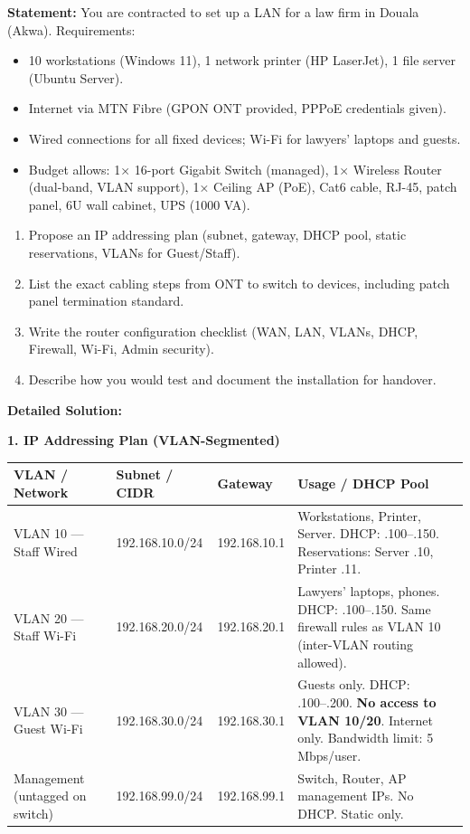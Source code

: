 \documentclass[11pt]{article}
\begin{document}
\begin{exoresolu}
\textbf{Statement:} 
You are contracted to set up a LAN for a law firm in Douala (Akwa). Requirements:
\begin{itemize}
\item 10 workstations (Windows 11), 1 network printer (HP LaserJet), 1 file server (Ubuntu Server).
\item Internet via MTN Fibre (GPON ONT provided, PPPoE credentials given).
\item Wired connections for all fixed devices; Wi-Fi for lawyers' laptops and guests.
\item Budget allows: 1× 16-port Gigabit Switch (managed), 1× Wireless Router (dual-band, VLAN support), 1× Ceiling AP (PoE), Cat6 cable, RJ-45, patch panel, 6U wall cabinet, UPS (1000 VA).
\end{itemize}
\begin{enumerate}
\item Propose an IP addressing plan (subnet, gateway, DHCP pool, static reservations, VLANs for Guest/Staff).
\item List the exact cabling steps from ONT to switch to devices, including patch panel termination standard.
\item Write the router configuration checklist (WAN, LAN, VLANs, DHCP, Firewall, Wi-Fi, Admin security).
\item Describe how you would test and document the installation for handover.
\end{enumerate}
\tcblower
\textbf{Detailed Solution:}

\textbf{1. IP Addressing Plan (VLAN-Segmented)}

\begin{center}
\begin{tabularx}{\linewidth}{|l|l|l|X|}\hline
\rowcolor{popblueL}
\textbf{VLAN / Network} & \textbf{Subnet / CIDR} & \textbf{Gateway} & \textbf{Usage / DHCP Pool} \\ \hline
VLAN 10 — Staff Wired & 192.168.10.0/24 & 192.168.10.1 & Workstations, Printer, Server. DHCP: .100–.150. Reservations: Server .10, Printer .11. \\ \hline
VLAN 20 — Staff Wi-Fi & 192.168.20.0/24 & 192.168.20.1 & Lawyers' laptops, phones. DHCP: .100–.150. Same firewall rules as VLAN 10 (inter-VLAN routing allowed). \\ \hline
VLAN 30 — Guest Wi-Fi & 192.168.30.0/24 & 192.168.30.1 & Guests only. DHCP: .100–.200. \textbf{No access to VLAN 10/20}. Internet only. Bandwidth limit: 5 Mbps/user. \\ \hline
Management (untagged on switch) & 192.168.99.0/24 & 192.168.99.1 & Switch, Router, AP management IPs. No DHCP. Static only. \\ \hline
\end{tabularx}
\end{center}


\end{exoresolu}
\end{document}
